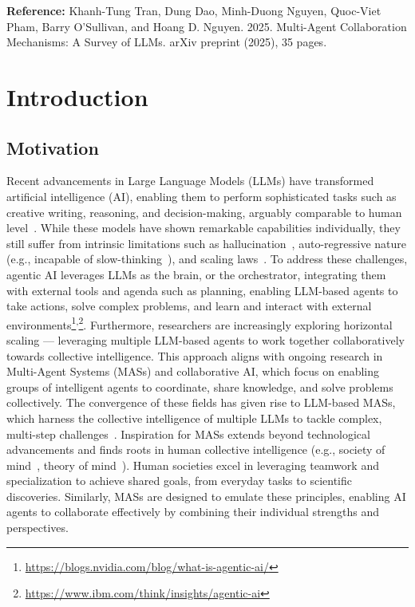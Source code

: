\documentclass[acmsmall,nonacm]{acmart}
\begin{document}
\hfill \break
\textbf{Reference:} Khanh-Tung Tran, Dung Dao, Minh-Duong Nguyen, Quoc-Viet Pham, Barry O’Sullivan, and Hoang D. Nguyen. 2025. Multi-Agent Collaboration Mechanisms: A Survey of LLMs. arXiv preprint (2025), 35 pages.


\newpage
\section{Introduction} \label{sec:Introduction}
    \subsection{Motivation}
    
        Recent advancements in Large Language Models (LLMs) have transformed artificial intelligence (AI), enabling them to perform sophisticated tasks such as creative writing, reasoning, and decision-making, arguably comparable to human level~\cite{zhao2023survey}. While these models have shown remarkable capabilities individually, they still suffer from intrinsic limitations such as hallucination~\cite{huang2023survey}, auto-regressive nature (e.g., incapable of slow-thinking~\cite{hagendorff2023human}), and scaling laws~\cite{kaplan2020scaling,10.5555/3600270.3602446}. To address these challenges, agentic AI leverages LLMs as the brain, or the orchestrator, integrating them with external tools and agenda such as planning, enabling LLM-based agents to take actions, solve complex problems, and learn and interact with external environments\footnote{\url{https://blogs.nvidia.com/blog/what-is-agentic-ai/}}\textsuperscript{,}\footnote{\url{https://www.ibm.com/think/insights/agentic-ai}}. Furthermore, researchers are increasingly exploring horizontal scaling — leveraging multiple LLM-based agents to work together collaboratively towards collective intelligence. This approach aligns with ongoing research in Multi-Agent Systems (MASs) and collaborative AI, which focus on enabling groups of intelligent agents to coordinate, share knowledge, and solve problems collectively. The convergence of these fields has given rise to LLM-based MASs, which harness the collective intelligence of multiple LLMs to tackle complex, multi-step challenges~\cite{sun2024llm}. Inspiration for MASs extends beyond technological advancements and finds roots in human collective intelligence (e.g., society of mind~\cite{minsky1988society}, theory of mind~\cite{frith2005theory}). Human societies excel in leveraging teamwork and specialization to achieve shared goals, from everyday tasks to scientific discoveries. Similarly, MASs are designed to emulate these principles, enabling AI agents to collaborate effectively by combining their individual strengths and perspectives.
\end{document}

